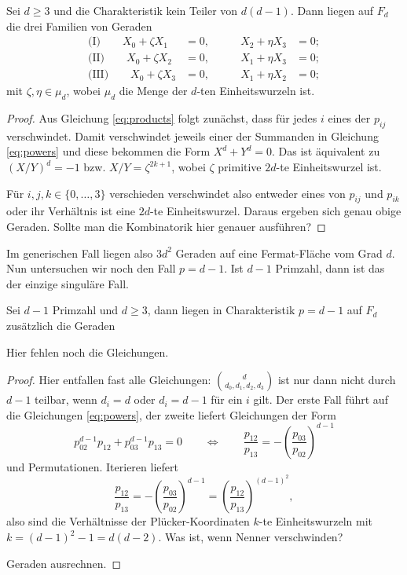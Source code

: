 \begin{fact}
Sei $d \geq 3$ und die Charakteristik kein Teiler von $d(d-1)$. Dann liegen auf $F_d$ die drei Familien von Geraden
\begin{align*}
\text{(I)}\qquad	X_0 + \zeta X_1 &= 0, \qquad &X_2 + \eta X_3 &= 0; \\
\text{(II)}\qquad	X_0 + \zeta X_2 &= 0, \qquad &X_1 + \eta X_3 &= 0; \\
\text{(III)}\qquad	X_0 + \zeta X_3 &= 0, \qquad &X_1 + \eta X_2 &= 0;
\end{align*}
mit $\zeta, \eta \in \mu_d$, wobei $\mu_d$ die Menge der $d$-ten Einheitswurzeln ist.
\end{fact}
\begin{proof}
Aus Gleichung \ref{eq:products} folgt zunächst, dass für jedes $i$ eines der $p_{ij}$ verschwindet. Damit verschwindet jeweils einer der Summanden in Gleichung \ref{eq:powers} und diese bekommen die Form $X^d + Y^d = 0$. Das ist äquivalent zu $(X/Y)^d = -1$ bzw. $X/Y = \zeta^{2k+1}$, wobei $\zeta$ primitive $2d$-te Einheitswurzel ist.

Für $i,j,k \in \{0,\dots,3\}$ verschieden verschwindet also entweder eines von $p_{ij}$ und $p_{ik}$ oder ihr Verhältnis ist eine $2d$-te Einheitswurzel. Daraus ergeben sich genau obige Geraden. \note Sollte man die Kombinatorik hier genauer ausführen?
\end{proof}

Im generischen Fall liegen also $3d^2$ Geraden auf eine Fermat-Fläche vom Grad $d$. Nun untersuchen wir noch den Fall $p = d-1$. Ist $d-1$ Primzahl, dann ist das der einzige singuläre Fall.

\begin{prop}
Sei $d-1$ Primzahl und $d \geq 3$, dann liegen in Charakteristik $p=d-1$ auf $F_d$ zusätzlich die Geraden

\todo Hier fehlen noch die Gleichungen.
\end{prop}
\begin{proof}
Hier entfallen fast alle Gleichungen: $\binom d{d_0,d_1,d_2,d_3}$ ist nur dann nicht durch $d-1$ teilbar, wenn $d_i=d$ oder $d_i=d-1$ für ein $i$ gilt. Der erste Fall führt auf die Gleichungen \ref{eq:powers}, der zweite liefert Gleichungen der Form
\begin{equation}
p_{02}^{d-1} p_{12} + p_{03}^{d-1} p_{13} = 0 \qquad\Leftrightarrow\qquad \frac{p_{12}}{p_{13}} = -\left(\frac{p_{03}}{p_{02}}\right)^{d-1}
\end{equation}
und Permutationen. Iterieren liefert
\begin{equation*}
\frac{p_{12}}{p_{13}} = -\left(\frac{p_{03}}{p_{02}}\right)^{d-1} = \left(\frac{p_{12}}{p_{13}}\right)^{(d-1)^2},
\end{equation*}
also sind die Verhältnisse der Plücker-Koordinaten $k$-te Einheitswurzeln mit $k=(d-1)^2-1=d(d-2)$. \note Was ist, wenn Nenner verschwinden?

\todo Geraden ausrechnen.
\end{proof}
